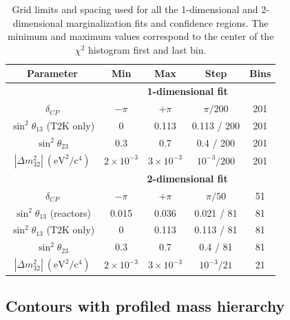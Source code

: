 \begin{table}[htb]
\centering
\begin{tabular}{| c | c | c | c | c |}
\hline
Parameter 					& Min 			& Max			& Step			& Bins	  	\\
\hline

& \multicolumn{4}{c|}{\bf 1-dimensional fit}  \\
\hline
$\delta_{CP}$ 					& $-\pi$			& $+\pi$			& $\pi / 200$		& 201		\\
$\sin^2 \theta_{13}$ 	(T2K only) 	& 0				& 0.113			& 0.113 / 200		& 201 		\\
$\sin^2 \theta_{23}$ 				& 0.3				& 0.7				& 0.4 / 200 		& 201		\\
$|\Delta m^2_{32}|~(\text{eV}^2 / \text{c}^4)$ 			& $2\times10^{-3}$	& $3\times10^{-3}$	& $10^{-3} / 200$	& 201 		\\
\hline

& \multicolumn{4}{c|}{\bf 2-dimensional fit}  \\
\hline
$\delta_{CP}$ 					& $-\pi$			& $+\pi$			& $\pi / 50$		& 51			\\
$\sin^2 \theta_{13}$ 	(reactors)	 	& 0.015			& 0.036			& 0.021 / 81		& 81	 		\\
$\sin^2 \theta_{13}$ 	(T2K only) 	& 0				& 0.113			& 0.113 / 81		& 81 			\\
$\sin^2 \theta_{23}$ 				& 0.3				& 0.7				& 0.4 / 81 			& 81			\\
$|\Delta m^2_{32}|~(\text{eV}^2 / \text{c}^4)$ 			& $2\times10^{-3}$	& $3\times10^{-3}$	& $10^{-3} / 21$	& 21 			\\
\hline

\end{tabular}
\caption{
Grid limits and spacing used for all the 1-dimensional and 2-dimensional marginalization fits and confidence regions.
The minimum and maximum values correspond to the center of the $\chi^2$ histogram first and last bin.
}
\label{tab:marg_binnning}
\end{table}






\subsection{Contours with profiled mass hierarchy}
\label{sec:cl_mh}

